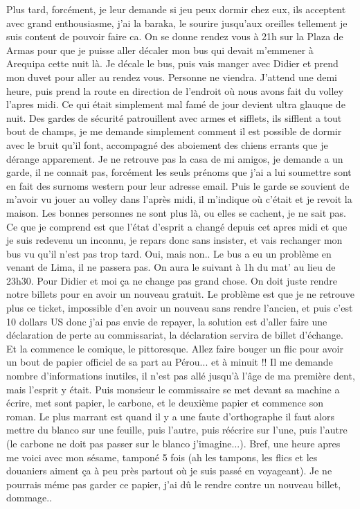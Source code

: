 \begin{multicols}{2}
Plus tard, forcément, je leur demande si jeu peux dormir chez eux, ils acceptent avec grand enthousiasme, j'ai la baraka, le sourire jusqu'aux oreilles tellement je suis content de pouvoir faire ca. On se donne rendez vous à 21h sur la Plaza de Armas pour que je puisse aller décaler mon bus qui devait m'emmener à Arequipa cette nuit là. Je décale le bus, puis vais manger avec Didier et prend mon duvet pour aller au rendez vous. Personne ne viendra. J'attend une demi heure, puis prend la route en direction de l'endroit où nous avons fait du volley l'apres midi. Ce qui était simplement mal famé de jour devient ultra glauque de nuit. Des gardes de sécurité patrouillent avec armes et sifflets, ils sifflent a tout bout de champs, je me demande simplement comment il est possible de dormir avec le bruit qu'il font, accompagné des aboiement des chiens errants que je dérange apparement. Je ne retrouve pas la casa de mi amigos, je demande a un garde, il ne connait pas, forcément les seuls prénoms que j'ai a lui soumettre sont en fait des surnoms western pour leur adresse email. Puis le garde se souvient de m'avoir vu jouer au volley dans l'après midi, il m'indique où c'était et je revoit la maison. Les bonnes personnes ne sont plus là, ou elles se cachent, je ne sait pas. Ce que je comprend est que l'état d'esprit a changé depuis cet apres midi et que je suis redevenu un inconnu, je repars donc sans insister, et vais rechanger mon bus vu qu'il n'est pas trop tard. Oui, mais non.. Le bus a eu un problème en venant de Lima, il ne passera pas. On aura le suivant à 1h du mat' au lieu de 23h30. Pour Didier et moi ça ne change pas grand chose. On doit juste rendre notre billets pour en avoir un nouveau gratuit. Le problème est que je ne retrouve plus ce ticket, impossible d'en avoir un nouveau sans rendre l'ancien, et puis c'est 10 dollars US donc j'ai pas envie de repayer, la solution est d'aller faire une déclaration de perte au commissariat, la déclaration servira de billet d'échange. Et la commence le comique, le pittoresque. Allez faire bouger un flic pour avoir un bout de papier officiel de sa part au Pérou... et à minuit !! Il me demande nombre d'informations inutiles, il n'est pas allé jusqu'à l'âge de ma première dent, mais l'esprit y était. Puis monsieur le commissaire se met devant sa machine a écrire, met sont papier, le carbone, et le deuxième papier et commence son roman. Le plus marrant est quand il y a une faute d'orthographe il faut alors mettre du blanco sur une feuille, puis l'autre, puis réécrire sur l'une, puis l'autre (le carbone ne doit pas passer sur le blanco j'imagine...). Bref, une heure apres me voici avec mon sésame, tamponé 5 fois (ah les tampons, les flics et les douaniers aiment ça à peu près partout où je suis passé en voyageant). Je ne pourrais méme pas garder ce papier, j'ai dû le rendre contre un nouveau billet, dommage..


\end{multicols}
